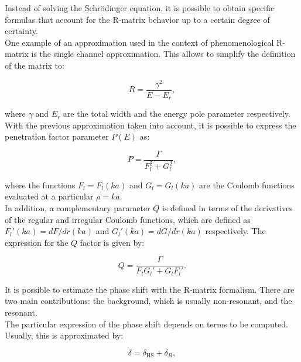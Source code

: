 \documentclass[openany]{book}
\begin{document}
Instead of solving the Schrödinger equation, it is possible to obtain specific formulas that account for the R-matrix  behavior up to a certain degree of certainty.  \\

One example of an approximation used in the context of phenomenological R-matrix is the single channel approximation. This allows to simplify the definition of the matrix to: 

\begin{equation} \label{eq:rmatrix_simplified }
	R= \frac{\gamma^2}{E - E_r},
\end{equation}

where $\gamma$ and $E_r$ are the total width and the energy pole parameter respectively. \\

With the previous approximation taken into account, it is possible to express the penetration factor parameter $P(E)$ as:

\begin{equation} \label{eq:rmatrix_penetrationFactor_coulomb}
	P= \frac{\Gamma}{F_l^2 + G_l^2},
\end{equation}

where the functions $F_l = F_l(ka)$ and $G_l = G_l(ka)$ are the Coulomb functions evaluated at a particular $\rho = ka$. \\

In addition, a complementary parameter $Q$ is defined in terms of the derivatives of the regular and irregular Coulomb functions, which are defined as $F_l'(ka) = dF/dr(ka)$ and $G_l'(ka) = dG/dr(ka)$ respectively. The expression for the $Q$ factor is given by: 

\begin{equation} \label{eq:rmatrix_QFactor}
	Q = \frac{\Gamma}{F_lG_l' + G_lF_l'}.
\end{equation}

It is possible to estimate the phase shift with the R-matrix formalism. There are two main contributions: the background, which is usually non-resonant, and the resonant. \\

The particular expression of the phase shift depends on terms to be computed. Usually, this is approximated by:

\begin{equation}  \label{eq:rmatrix_phaseShift}
	\delta = \delta_{\mathrm{HS}} + \delta_R,
\end{equation}
\end{document}
